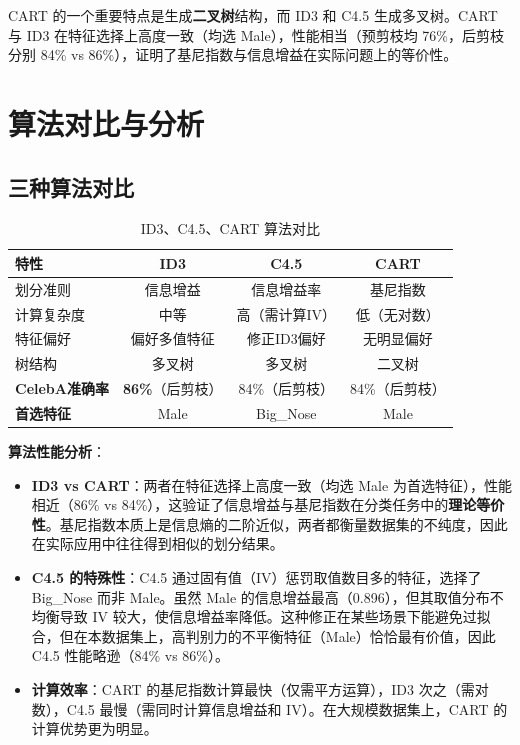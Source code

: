 \documentclass[UTF8]{ctexart}
\begin{document}
\noindent CART 的一个重要特点是生成\textbf{二叉树}结构，而 ID3 和 C4.5 生成多叉树。CART 与 ID3 在特征选择上高度一致（均选 Male），性能相当（预剪枝均 76\%，后剪枝分别 84\% vs 86\%），证明了基尼指数与信息增益在实际问题上的等价性。

\section{算法对比与分析}

\subsection{三种算法对比}

\begin{table}[H]
    \centering
    \caption{ID3、C4.5、CART 算法对比}
    \begin{tabular}{lccc}
    \toprule
    \textbf{特性} & \textbf{ID3} & \textbf{C4.5} & \textbf{CART} \\
    \midrule
    划分准则 & 信息增益 & 信息增益率 & 基尼指数 \\
    计算复杂度 & 中等 & 高（需计算IV） & 低（无对数） \\
    特征偏好 & 偏好多值特征 & 修正ID3偏好 & 无明显偏好 \\
    树结构 & 多叉树 & 多叉树 & 二叉树 \\
    \midrule
    \textbf{CelebA准确率} & \textbf{86\%}（后剪枝） & 84\%（后剪枝） & 84\%（后剪枝） \\
    \textbf{首选特征} & Male & Big\_Nose & Male \\
    \bottomrule
    \end{tabular}
\end{table}

\noindent \textbf{算法性能分析}：

\begin{itemize}
    \item \textbf{ID3 vs CART}：两者在特征选择上高度一致（均选 Male 为首选特征），性能相近（86\% vs 84\%），这验证了信息增益与基尼指数在分类任务中的\textbf{理论等价性}。基尼指数本质上是信息熵的二阶近似，两者都衡量数据集的不纯度，因此在实际应用中往往得到相似的划分结果。
    
    \item \textbf{C4.5 的特殊性}：C4.5 通过固有值（IV）惩罚取值数目多的特征，选择了 Big\_Nose 而非 Male。虽然 Male 的信息增益最高（0.896），但其取值分布不均衡导致 IV 较大，使信息增益率降低。这种修正在某些场景下能避免过拟合，但在本数据集上，高判别力的不平衡特征（Male）恰恰最有价值，因此 C4.5 性能略逊（84\% vs 86\%）。
    
    \item \textbf{计算效率}：CART 的基尼指数计算最快（仅需平方运算），ID3 次之（需对数），C4.5 最慢（需同时计算信息增益和 IV）。在大规模数据集上，CART 的计算优势更为明显。
\end{itemize}
\end{document}
